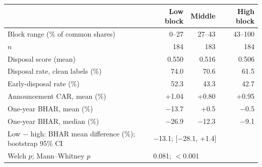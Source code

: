 \begin{tabular}{lrrr}
\toprule
 & Low block & Middle & High block \\
\midrule
Block range (\% of common shares) & 0--27 & 27--43 & 43--100 \\
$n$ & 184 & 183 & 184 \\
Disposal score (mean) & 0.550 & 0.516 & 0.506 \\
Disposal rate, clean labels (\%) & 74.0 & 70.6 & 61.5 \\
Early-disposal rate (\%) & 52.3 & 43.3 & 42.7 \\
Announcement CAR, mean (\%) & +1.04 & +0.80 & +0.95 \\
One-year BHAR, mean (\%) & $-$13.7 & +0.5 & $-$0.5 \\
One-year BHAR, median (\%) & $-$26.9 & $-$12.3 & $-$9.1 \\
\midrule
Low $-$ high: BHAR mean difference (\%); bootstrap 95\% CI & \multicolumn{3}{l}{$-$13.1; [$-$28.1, +1.4]} \\
\quad Welch $p$; Mann--Whitney $p$ & \multicolumn{3}{l}{0.081; $<$0.001} \\
\bottomrule
\end{tabular}

